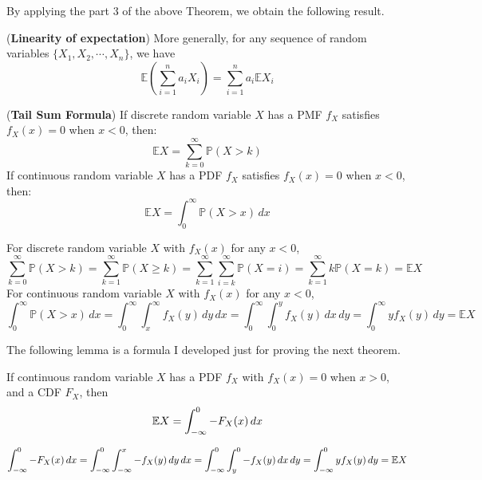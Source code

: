 \documentclass{huhtakm-template-book}
\newcommand{\prob}{\mathbb{P}}
\newcommand{\expect}{\mathbb{E}}
\begin{document}
By applying the part 3 of the above Theorem, we obtain the following result. 
\begin{lem}(\textbf{Linearity of expectation}) 
	More generally, for any sequence of random variables $\{X_{1},X_{2},\cdots,X_{n}\}$, we have
	\begin{equation*}
		\expect\left(\sum_{i=1}^{n}a_{i}X_{i}\right)=\sum_{i=1}^{n}a_{i}\expect X_{i}
	\end{equation*}
\end{lem}
\begin{thm}(\textbf{Tail Sum Formula})
	\label{Chapter 6 (Theorem) Tail sum formula}
	If discrete random variable $X$ has a PMF $f_{X}$ satisfies $f_{X}(x)=0$ when $x<0$, then:
	\begin{equation*}
		\expect{X}=\sum_{k=0}^{\infty}\prob(X>k)
	\end{equation*}
	If continuous random variable $X$ has a PDF $f_{X}$ satisfies $f_{X}(x)=0$ when $x<0$, then:
	\begin{equation*}
		\expect{X}=\int_{0}^{\infty}\prob(X>x)\,dx
	\end{equation*}
\end{thm}
\begin{proofing}
	For discrete random variable $X$ with $f_{X}(x)$ for any $x<0$,
	\begin{equation*}
		\sum_{k=0}^{\infty}\prob(X>k)=\sum_{k=1}^{\infty}\prob(X\geq k)=\sum_{k=1}^{\infty}\sum_{i=k}^{\infty}\prob(X=i)=\sum_{k=1}^{\infty}k\prob(X=k)=\expect{X}
	\end{equation*}
	For continuous random variable $X$ with $f_{X}(x)$ for any $x<0$,
	\begin{equation*}
		\int_{0}^{\infty}\prob(X>x)\,dx=\int_{0}^{\infty}\int_{x}^{\infty}f_{X}(y)\,dy\,dx=\int_{0}^{\infty}\int_{0}^{y}f_{X}(y)\,dx\,dy=\int_{0}^{\infty}yf_{X}(y)\,dy=\expect{X}
	\end{equation*}
\end{proofing}
The following lemma is a formula I developed just for proving the next theorem.
\begin{lem}
	\label{Chapter 6 (Lemma) Expectation as integral of CDF}
	If continuous random variable $X$ has a PDF $f_{X}$ with $f_{X}(x)=0$ when $x>0$, and a CDF $F_{X}$, then
	\begin{equation*}
		\expect X=\intlu{-\infty}{0}-F_{X}(x)\,dx
	\end{equation*}
\end{lem}
\begin{proofing}
	\begin{equation*}
		\intlu{-\infty}{0}-F_{X}(x)\,dx=\intlu{-\infty}{0}\intlu{-\infty}{x}-f_{X}(y)\,dy\,dx=\intlu{-\infty}{0}\intlu{y}{0}-f_{X}(y)\,dx\,dy=\intlu{-\infty}{0}yf_{X}(y)\,dy=\expect X
	\end{equation*}
\end{proofing}
\end{document}

